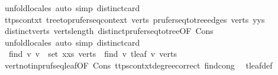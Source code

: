 \begin{isabellebody}
\ {\isacharparenleft}{\kern0pt}unfold{\isacharunderscore}{\kern0pt}locales{\isacharcomma}{\kern0pt}\ auto\ simp{\isacharcolon}{\kern0pt}\ distinct{\isacharunderscore}{\kern0pt}card{\isacharparenright}{\kern0pt}\isanewline
\ \ \ \ \isamarkupfalse%
\ ttps{\isacharunderscore}{\kern0pt}contxt{}{\isacharcolon}{\kern0pt}\ tree{\isacharunderscore}{\kern0pt}to{\isacharunderscore}{\kern0pt}prufer{\isacharunderscore}{\kern0pt}seq{\isacharunderscore}{\kern0pt}context\ verts\ {\isachardoublequoteopen}prufer{\isacharunderscore}{\kern0pt}seq{\isacharunderscore}{\kern0pt}to{\isacharunderscore}{\kern0pt}tree{\isacharunderscore}{\kern0pt}edges\ verts\ {\isacharparenleft}{\kern0pt}y{\isacharhash}{\kern0pt}ys{\isacharparenright}{\kern0pt}{\isachardoublequoteclose}\isanewline
\ \ \ \ \ \ \isamarkupfalse%
\ distinct{\isacharunderscore}{\kern0pt}verts\ verts{\isacharunderscore}{\kern0pt}length\ distinct{\isacharunderscore}{\kern0pt}prufer{\isacharunderscore}{\kern0pt}seq{\isacharunderscore}{\kern0pt}to{\isacharunderscore}{\kern0pt}tree{\isacharbrackleft}{\kern0pt}OF\ Cons{\isacharparenleft}{\kern0pt}{}{\isacharparenright}{\kern0pt}{\isacharbrackright}{\kern0pt}\ \isamarkupfalse%
\ {\isacharparenleft}{\kern0pt}unfold{\isacharunderscore}{\kern0pt}locales{\isacharcomma}{\kern0pt}\ auto\ simp{\isacharcolon}{\kern0pt}\ distinct{\isacharunderscore}{\kern0pt}card{\isacharparenright}{\kern0pt}\isanewline
\ \ \ \ \isamarkupfalse%
\ {}{\isacharcolon}{\kern0pt}\ {\isachardoublequoteopen}find\ {\isacharparenleft}{\kern0pt}{\isasymlambda}v{\isachardot}{\kern0pt}\ v\ {\isasymnotin}\ set\ {\isacharparenleft}{\kern0pt}x{\isacharhash}{\kern0pt}xs{\isacharparenright}{\kern0pt}{\isacharparenright}{\kern0pt}\ verts\ {\isacharequal}{\kern0pt}\ find\ {\isacharparenleft}{\kern0pt}{\isasymlambda}v{\isachardot}{\kern0pt}\ t{}{\isachardot}{\kern0pt}leaf\ v{\isacharparenright}{\kern0pt}\ verts{\isachardoublequoteclose}\ \isamarkupfalse%
\ vert{\isacharunderscore}{\kern0pt}notin{\isacharunderscore}{\kern0pt}pruf{\isacharunderscore}{\kern0pt}seq{\isacharunderscore}{\kern0pt}leaf{\isacharbrackleft}{\kern0pt}OF\ Cons{\isacharparenleft}{\kern0pt}{}{\isacharparenright}{\kern0pt}{\isacharbrackright}{\kern0pt}\ ttps{\isacharunderscore}{\kern0pt}contxt{}{\isachardot}{\kern0pt}degree{\isacharunderscore}{\kern0pt}correct\ find{\isacharunderscore}{\kern0pt}cong\ \isamarkupfalse%
\ t{}{\isachardot}{\kern0pt}leaf{\isacharunderscore}{\kern0pt}def\ \isamarkupfalse%

\end{isabellebody}
